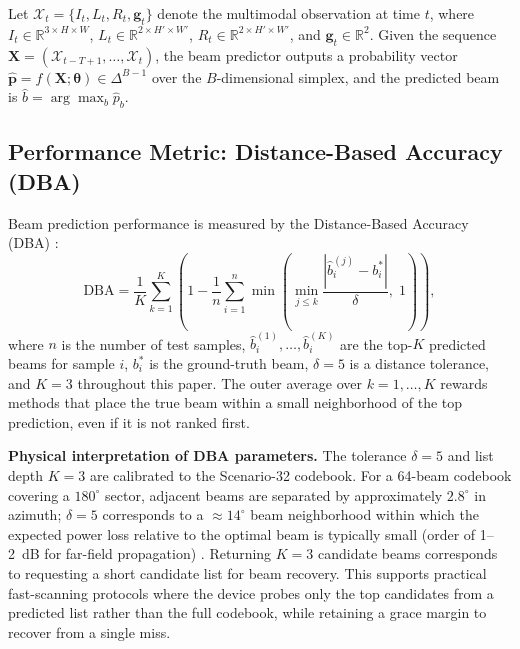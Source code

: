 \documentclass[journal,10pt,twoside]{IEEEtran}
\newcommand{\DBA}{\mathrm{DBA}}
\begin{document}
Let $\mathcal{X}_t = \{I_t, L_t, R_t, \mathbf{g}_t\}$ denote the
multimodal observation at time $t$, where $I_t \in \mathbb{R}^{3\times H\times W}$,
$L_t \in \mathbb{R}^{2\times H'\times W'}$, $R_t \in \mathbb{R}^{2\times H'\times W'}$,
and $\mathbf{g}_t \in \mathbb{R}^2$.
Given the sequence $\mathbf{X} = (\mathcal{X}_{t-T+1}, \ldots, \mathcal{X}_t)$,
the beam predictor outputs a probability vector
$\hat{\mathbf{p}} = f(\mathbf{X};\boldsymbol{\theta}) \in \Delta^{B-1}$
over the $B$-dimensional simplex, and the predicted beam is
$\hat{b} = \arg\max_b \hat{p}_b$.

\subsection{Performance Metric: Distance-Based Accuracy (DBA)}

Beam prediction performance is measured by the Distance-Based Accuracy (DBA)
\cite{deepsense6g_2023}:
\begin{equation}
  \DBA = \frac{1}{K} \sum_{k=1}^{K}
    \left(1 - \frac{1}{n} \sum_{i=1}^{n}
      \min\!\left(
        \min_{j \leq k} \frac{|\hat{b}^{(j)}_i - b^*_i|}{\delta},\; 1
      \right)
    \right),
  \label{eq:dba}
\end{equation}
where $n$ is the number of test samples, $\hat{b}^{(1)}_i, \ldots,
\hat{b}^{(K)}_i$ are the top-$K$ predicted beams for sample $i$,
$b^*_i$ is the ground-truth beam, $\delta = 5$ is a distance tolerance,
and $K = 3$ throughout this paper.
The outer average over $k=1,\ldots,K$ rewards methods that place the true
beam within a small neighborhood of the top prediction, even if it is not
ranked first.

\noindent\textbf{Physical interpretation of DBA parameters.}
The tolerance $\delta = 5$ and list depth $K = 3$ are calibrated to the
Scenario-32 codebook. For a 64-beam codebook covering a $180^\circ$ sector,
adjacent beams are separated by approximately $2.8^\circ$ in azimuth;
$\delta = 5$ corresponds to a $\approx\!14^\circ$ beam neighborhood within
which the expected power loss relative to the optimal beam is typically small
(order of 1--2~dB for far-field propagation) \cite{va2016beam}.
Returning $K = 3$ candidate beams corresponds to requesting a short candidate
list for beam recovery. This supports practical fast-scanning protocols where
the device probes only the top candidates from a predicted list rather than
the full codebook, while retaining a grace margin to recover from a single
miss.
\end{document}
